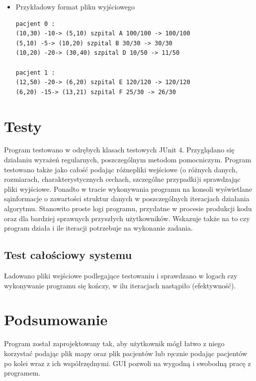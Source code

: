 \documentclass[11pt, a4paper]{article}
\begin{document}
\begin{itemize}
    \item Przykładowy format pliku wyjściowego
    \begin{lstlisting}
pacjent 0 :
(10,30) -10-> (5,10) szpital A 100/100 -> 100/100
(5,10) -5-> (10,20) szpital B 30/30 -> 30/30
(10,20) -20-> (30,40) szpital D 10/50 -> 11/50

pacjent 1 :
(12,50) -20-> (6,20) szpital E 120/120 -> 120/120
(6,20) -15-> (13,21) szpital F 25/30 -> 26/30
\end{lstlisting}
\end{itemize}

    

\section{Testy}
Program testowano w odrębych klasach testowych JUnit 4. Przyglądano się działaniu wyrażeń regularnych, poszczególnym metodom pomocniczym. Program testowano także jako całość podając różnepliki wejściowe (o różnych danych, rozmiarach, charakterystycznych cechach, szczególne przypadki)i sprawdzając pliki wyjściowe. Ponadto w tracie wykonywania programu na konsoli wyświetlane sąinformacje o zawartości struktur danych w poszczególnych iteracjach działania algorytmu. Stanowito proste logi programu, przydatne w procesie produkcji kodu oraz dla bardziej sprawnych przyszłych użytkowników. Wskazuje także na to czy program działa i ile iteracji potrzebuje na wykonanie zadania.
\subsection{Test całościowy systemu}
Ładowano pliki wejściowe podlegające testowaniu i sprawdzano w logach czy wykonywanie programu się kończy, w ilu iteracjach nastąpiło (efektywność).
\section{Podsumowanie}
Program został zaprojektowany tak, aby użytkownik mógł łatwo z niego korzystać podając plik mapy oraz plik pacjentów lub ręcznie podając pacjentów po kolei wraz z ich współrzędnymi. GUI pozwoli na wygodną i swobodną pracę z programem.
\end{document}
